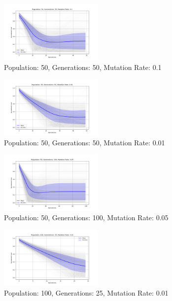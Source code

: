 \documentclass{article}
\begin{document}
    \begin{figure}[H]
        \centering
        \includegraphics[width=0.45\textwidth]{genetic_algorithm/appendix/Population_50_Generations_50_MutationRate_0.1}
        \caption{Population: 50, Generations: 50, Mutation Rate: 0.1}
        \label{fig:app_ga_50_50_1}
    \end{figure}

    \begin{figure}[H]
        \centering
        \includegraphics[width=0.45\textwidth]{genetic_algorithm/appendix/Population_50_Generations_50_MutationRate_0.01}
        \caption{Population: 50, Generations: 50, Mutation Rate: 0.01}
        \label{fig:app_ga_50_50_01}
    \end{figure}


    \begin{figure}[H]
        \centering
        \includegraphics[width=0.45\textwidth]{genetic_algorithm/appendix/Population_50_Generations_100_MutationRate_0.05}
        \caption{Population: 50, Generations: 100, Mutation Rate: 0.05}
        \label{fig:app_ga_50_100_05}
    \end{figure}

    \begin{figure}[H]
        \centering
        \includegraphics[width=0.45\textwidth]{genetic_algorithm/appendix/Population_100_Generations_25_MutationRate_0.01}
        \caption{Population: 100, Generations: 25, Mutation Rate: 0.01}
        \label{fig:app_ga_100_25_01}
    \end{figure}
\end{document}
